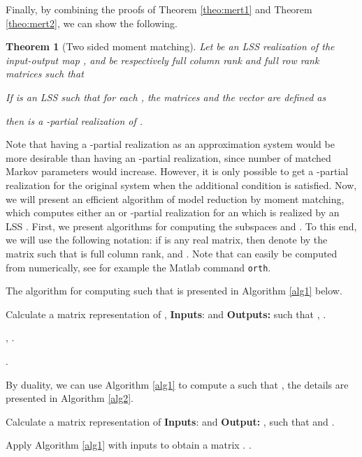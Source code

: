 \documentclass[journal]{IEEEtran}
\newtheorem{Theorem}{Theorem}
\begin{document}
Finally, by combining the proofs of Theorem \ref{theo:mert1} and Theorem \ref{theo:mert2}, we can show the following.

\begin{Theorem}[Two sided moment matching] \label{theo:mert3}
	Let  be an LSS realization of the input-output map ,  and  be respectively full column rank and full row rank matrices such that
	
If  is an LSS such that for each , the matrices  and the vector  are defined as
	
	then  is a -partial realization of .
\end{Theorem}

Note that having a -partial realization as an approximation system would be more desirable than having an -partial realization, since number of matched Markov parameters would increase. However, it is only possible to get a -partial realization for the original system  when the additional condition  is satisfied. Now, we will present an efficient algorithm of model reduction by moment matching, which computes either an  or -partial realization  for an  which is realized by an LSS . First, we present algorithms for computing the subspaces  and . To this end, we will use the following notation: if  is any real matrix, then denote by  the matrix  such that  is full column rank,  and . Note that  can easily be computed from  numerically, see for example the Matlab command \texttt{orth}.

The algorithm for computing  such that  is presented in Algorithm \ref{alg1} below.

\begin{algorithm}[h]
	\caption{
		Calculate  a matrix representation of ,
		\newline
		\textbf{Inputs}:  and 
		\newline
		\textbf{Outputs:}  such that ,
		.
	}
	\label{alg1}
	\begin{algorithmic}
		\STATE , .
		\FOR{} 
		\STATE
		
		\ENDFOR
		\RETURN .
	\end{algorithmic}
\end{algorithm}

By duality, we can use Algorithm \ref{alg1} to compute a  such that , the details are presented in Algorithm \ref{alg2}.

\begin{algorithm}
	\caption{
		Calculate a matrix representation of 
		\newline
		\textbf{Inputs}:  and 
		\newline
		\textbf{Output:} , such that
		 and .
	}
	\label{alg2}
	\begin{algorithmic}
		\STATE Apply Algorithm \ref{alg1} with inputs  to obtain
		a matrix .
		\RETURN .
	\end{algorithmic}
\end{algorithm} 
\end{document}
